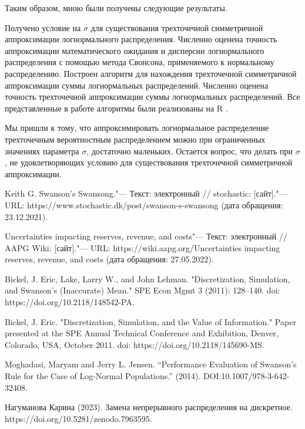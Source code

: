 \documentclass[specialist, substylefile = spbu.rtx,
subf,href,colorlinks=true, 12pt]{disser}
\begin{document}
\conclusion
Таким образом, мною были получены следующие результаты. 

Получено условие на $\sigma$ для существования трехточечной симметричной аппроксимации логнормального распределения.
Численно оценена точность аппроксимации математического ожидания и дисперсии логнормального распределения с помощью метода Свонсона, применяемого к нормальному распределению.
Построен алгоритм для нахождения трехточечной симметричной аппроксимации суммы логнормальных распределений.
Численно оценена точность трехточечной аппроксимации суммы логнормальных распределений.
Все представленные в работе алгоритмы были реализованы на R \cite{AAA}.

Мы пришли к тому, что аппроксимировать логнормальное распределение трехточечным вероятностным распределением можно при ограниченных значениях параметра $\sigma$, достаточно маленьких. Остается вопрос, что делать при $\sigma$, не удовлетворяющих условию для существования трехточечной симметричной аппроксимации.
	
	\begin{thebibliography}{1}
		 Keith G. Swanson's Swansong."--- Текст: электронный // stochastic: [сайт]."--- URL: https://www.stochastic.dk/post/swanson-s-swansong (дата обращения: 23.12.2021).
		
		 Uncertainties impacting reserves, revenue, and costs"--- Текст: электронный // AAPG Wiki: [сайт]."--- URL: https://wiki.aapg.org/Uncertainties impacting reserves, revenue, and costs (дата обращения: 27.05.2022).
		
		 Bickel, J. Eric, Lake, Larry W., and John Lehman. "Discretization, Simulation, and Swanson's (Inaccurate) Mean." SPE Econ Mgmt 3 (2011): 128–140. doi: https://doi.org/10.2118/148542-PA.
		
		 Bickel, J. Eric. "Discretization, Simulation, and the Value of Information." Paper presented at the SPE Annual Technical Conference and Exhibition, Denver, Colorado, USA, October 2011. doi: https://doi.org/10.2118/145690-MS.
		
		 Moghadasi, Maryam and Jerry L. Jensen. “Performance Evaluation of Swanson’s Rule for the Case of Log-Normal Populations.” (2014). DOI:10.1007/978-3-642-32408.
		
		 Нагуманова Карина (2023). Замена непрерывного распределения на дискретное. https://doi.org/10.5281/zenodo.7963595.
		
	\end{thebibliography}
	
\end{document}
